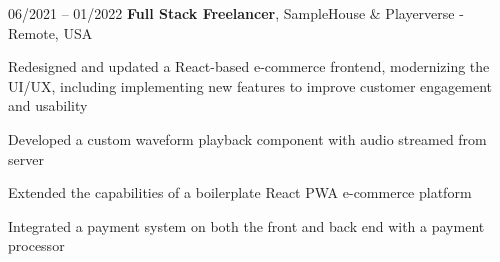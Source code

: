 

\begin{twocolentry}{
    06/2021 – 01/2022
}
\fontsize{11 pt}{11 pt}\textbf{Full Stack Freelancer}, SampleHouse \& Playerverse - Remote, USA\end{twocolentry}

\vspace{0.10 cm}
\begin{onecolentry}
   \begin{highlights}
       \item Redesigned and updated a React-based e-commerce frontend, modernizing the UI/UX, including implementing new features to improve customer engagement and usability
       \item Developed a custom waveform playback component with audio streamed from server
       \item Extended the capabilities of a boilerplate React PWA e-commerce platform
       \item Integrated a payment system on both the front and back end with a payment processor
   \end{highlights}
\end{onecolentry}